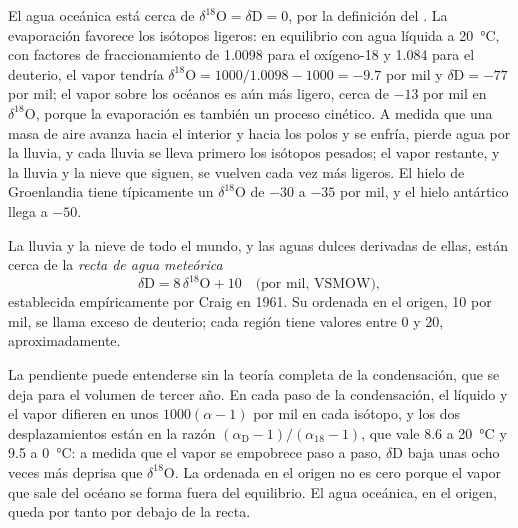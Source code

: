 El agua oceánica está cerca de $\delta^{18}\mathrm{O} = \delta\mathrm{D} = 0$, por la
definición del . La evaporación favorece los isótopos ligeros: en equilibrio
con agua líquida a \qty{20}{\degreeCelsius}, con factores de fraccionamiento de
1.0098 para el oxígeno-18 y 1.084 para el deuterio, el vapor tendría
$\delta^{18}\mathrm{O} = 1000/1.0098 - 1000 = -9.7$ por mil y $\delta\mathrm{D} =
-77$ por mil; el vapor sobre los océanos es aún más ligero, cerca de $-13$ por mil
en $\delta^{18}\mathrm{O}$, porque la evaporación es también un proceso cinético.
A medida que una masa de aire avanza hacia el interior y hacia los polos y se enfría, pierde agua por la lluvia, y
cada lluvia se lleva primero los isótopos pesados; el vapor restante, y la lluvia y
la nieve que siguen, se vuelven cada vez más ligeros. El hielo de Groenlandia tiene típicamente
un $\delta^{18}\mathrm{O}$ de $-30$ a $-35$ por mil, y el hielo antártico llega a $-50$.

\begin{proposition}\label{prop:b2:isotope-geochemistry:mwl}
La lluvia y la nieve de todo el mundo, y las aguas dulces derivadas de ellas,
están cerca de la \emph{recta de agua meteórica}
\[
  \delta\mathrm{D} = 8\,\delta^{18}\mathrm{O} + 10 \quad\text{(por mil, VSMOW)},
\]
establecida empíricamente por Craig en 1961. Su ordenada en el origen, 10 por mil, se llama
exceso de deuterio; cada región tiene valores entre 0 y 20, aproximadamente.
\end{proposition}
\admitted

\noindent La pendiente puede entenderse sin la teoría completa de la condensación,
que se deja para el volumen de tercer año. En cada paso de la condensación, el líquido
y el vapor difieren en unos $1000(\alpha - 1)$ por mil en cada isótopo, y
los dos desplazamientos están en la razón $(\alpha_{\mathrm D}-1)/(\alpha_{18}-1)$, que
vale 8.6 a \qty{20}{\degreeCelsius} y 9.5 a \qty{0}{\degreeCelsius}: a medida que el
vapor se empobrece paso a paso, $\delta\mathrm{D}$ baja unas ocho veces más deprisa
que $\delta^{18}\mathrm{O}$. La ordenada en el origen no es cero porque el vapor que sale
del océano se forma fuera del equilibrio. El agua oceánica, en el origen, queda por tanto
por debajo de la recta.

